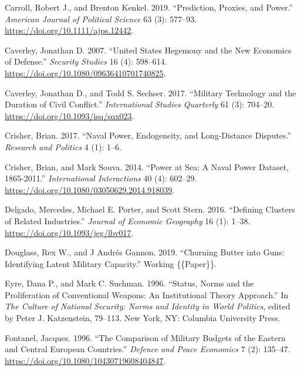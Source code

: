 \documentclass[
]{article}
\newlength{\cslhangindent}
\newlength{\cslentryspacingunit} %
\newenvironment{CSLReferences}[2] %
 {%
  \setlength{\parindent}{0pt}
  \ifodd #1
  \let\oldpar\par
  \def\par{\hangindent=\cslhangindent\oldpar}
  \fi
  \setlength{\parskip}{#2\cslentryspacingunit}
 }%
 {}
\begin{document}
\begin{CSLReferences}{1}{0}
\leavevmode{}%
Carroll, Robert J., and Brenton Kenkel. 2019. {``Prediction, {Proxies}, and {Power}.''} \emph{American Journal of Political Science} 63 (3): 577--93. \url{https://doi.org/10.1111/ajps.12442}.

\leavevmode{}%
Caverley, Jonathan D. 2007. {``United {States Hegemony} and the {New Economics} of {Defense}.''} \emph{Security Studies} 16 (4): 598--614. \url{https://doi.org/10.1080/09636410701740825}.

\leavevmode{}%
Caverley, Jonathan D., and Todd S. Sechser. 2017. {``Military {Technology} and the {Duration} of {Civil Conflict}.''} \emph{International Studies Quarterly} 61 (3): 704--20. \url{https://doi.org/10.1093/isq/sqx023}.

\leavevmode{}%
Crisher, Brian. 2017. {``Naval Power, Endogeneity, and Long-Distance Disputes.''} \emph{Research and Politics} 4 (1): 1--6.

\leavevmode{}%
Crisher, Brian, and Mark Souva. 2014. {``Power at {Sea}: {A Naval Power Dataset}, 1865-2011.''} \emph{International Interactions} 40 (4): 602--29. \url{https://doi.org/10.1080/03050629.2014.918039}.

\leavevmode{}%
Delgado, Mercedes, Michael E. Porter, and Scott Stern. 2016. {``Defining Clusters of Related Industries.''} \emph{Journal of Economic Geography} 16 (1): 1--38. \url{https://doi.org/10.1093/jeg/lbv017}.

\leavevmode{}%
Douglass, Rex W., and J Andrés Gannon. 2019. {``Churning {Butter} into {Guns}: {Identifying Latent Military Capacity}.''} Working \{\{Paper\}\}.

\leavevmode{}%
Eyre, Dana P., and Mark C. Suchman. 1996. {``Status, {Norms} and the {Proliferation} of {Conventional Weapons}: {An Institutional Theory Approach}.''} In \emph{The {Culture} of {National Security}: {Norms} and {Identity} in {World Politics}}, edited by Peter J. Katzenstein, 79--113. {New York, NY}: {Columbia University Press}.

\leavevmode{}%
Fontanel, Jacques. 1996. {``The Comparison of Military Budgets of the Eastern and Central {European} Countries.''} \emph{Defence and Peace Economics} 7 (2): 135--47. \url{https://doi.org/10.1080/10430719608404847}.


\end{CSLReferences}
\end{document}
